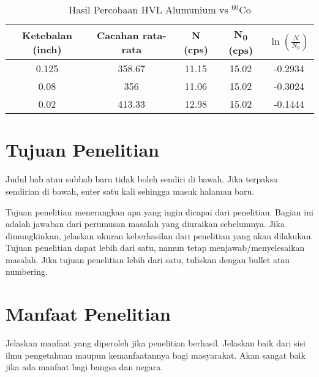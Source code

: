 \begin{table}[!htb] 
	\begin{center}
		\caption[Contoh HVL]{Hasil Percobaan HVL Alumunium vs $^{60}$Co}
		\label{tabel Al}
		\begin{tabular}{ccccc}
			\hline
			Ketebalan (inch) & Cacahan rata-rata & N (cps) & N\textsubscript{0} (cps) & $\ln\left(\frac{N}{N_0}\right)$\\
			\hline
			0.125 & 358.67 & 11.15 & 15.02 & -0.2934\\
			0.08 & 356 & 11.06 & 15.02 & -0.3024\\
			0.02 & 413.33 & 12.98 & 15.02 & -0.1444\\
			\hline
		\end{tabular}
	\end{center}
\end{table}

\section{Tujuan Penelitian} \label{tujuan}
Judul bab atau subbab baru tidak boleh sendiri di bawah. Jika terpaksa sendirian di bawah, enter satu kali sehingga masuk halaman baru. 

Tujuan penelitian menerangkan apa yang ingin dicapai dari penelitian. Bagian ini adalah jawaban dari perumusan masalah yang diuraikan sebelumnya. Jika dimungkinkan, jelaskan ukuran keberhasilan dari penelitian yang akan dilakukan. Tujuan penelitian dapat lebih dari satu, namun tetap menjawab/menyelesaikan masalah. Jika tujuan penelitian lebih dari satu, tuliskan dengan bullet atau numbering.

\section{Manfaat Penelitian}
Jelaskan manfaat yang diperoleh jika penelitian berhasil. Jelaskan baik dari sisi ilmu pengetahuan maupun kemanfaatannya bagi masyarakat. Akan sangat baik jika ada manfaat bagi bangsa dan negara.